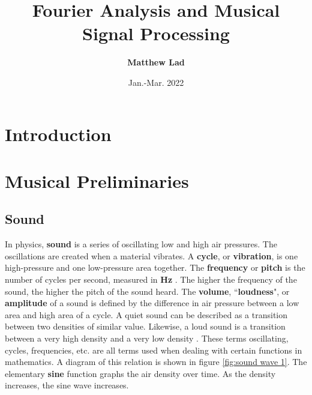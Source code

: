 \documentclass[10pt]{article}
\title{
    \textbf{Fourier Analysis and Musical Signal Processing}}
\author{\textbf{Matthew Lad}}
\date{Jan.-Mar. 2022}
\begin{document}
 
\maketitle

\section{Introduction}

\section{Musical Preliminaries}
\subsection{Sound}
\hspace{\parindent} In physics, \textbf{sound} is a series of oscillating low and high air pressures. The oscillations are created when a material vibrates. A \textbf{cycle}, or \textbf{vibration}, is one high-pressure and one low-pressure area together. The \textbf{frequency} or \textbf{pitch} is the number of cycles per second, measured in \textbf{Hz} \cite{hertzDefinition}. The higher the frequency of the sound, the higher the pitch of the sound heard. The \textbf{volume}, \textquotedblleft\textbf{loudness}", or \textbf{amplitude} of a sound is defined by the difference in air pressure between a low area and high area of a cycle. A quiet sound can be described as a transition between two densities of similar value. Likewise, a loud sound is a transition between a very high density and a very low density \cite{boatwright1956musictheory} \cite{lenssen2014fouriermusic}. These terms oscillating, cycles, frequencies, etc. are all terms used when dealing with certain functions in mathematics. A diagram of this relation is shown in figure \ref{fig:sound wave 1}. The elementary \textbf{sine} function graphs the air density over time. As the density increases, the sine wave increases.
\end{document}
